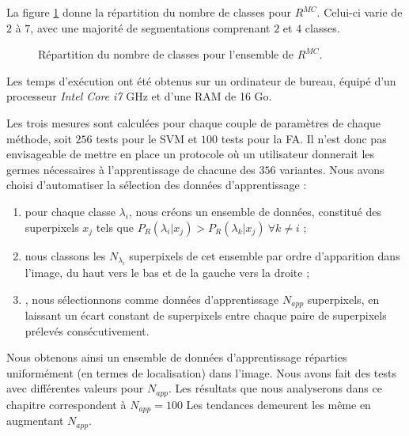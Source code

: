 La figure \ref{fig:saf:stnerClasses} donne la répartition du nombre de classes pour $R^{ MC}$. Celui-ci varie de $2$ à $7$, avec une majorité de segmentations comprenant $2$ et $4$ classes. 
\begin{figure}[htb]
\begin{center}
\scalebox{.5}{

}
\caption{Répartition du nombre de classes pour l'ensemble de  $R^{ MC}$.}
\label{fig:saf:stnerClasses}
\end{center}
\end{figure}

Les temps d'exécution ont été obtenus sur un ordinateur de bureau, équipé d'un processeur \emph{Intel Core i7}  GHz et d'une RAM de 16 Go. 

Les trois mesures sont calculées pour chaque couple de paramètres de chaque méthode, soit $256$ tests pour le SVM et $100$ tests pour la FA. Il n'est donc pas envisageable de mettre en place un protocole où un utilisateur donnerait les germes nécessaires à l'apprentissage de chacune des $356$ variantes. Nous avons choisi d'automatiser la sélection des données d'apprentissage  :
\begin{enumerate}
\item pour chaque classe $\lambda_{i}$, nous créons un ensemble de données, constitué des superpixels $x_{j}$ tels que $P_{R}(\lambda_{i} | x_{j}) > P_{R}(\lambda_{k} | x_{j}) \ \forall k \neq i$ ;
\item nous classons les $N_{\lambda_{i}}$ superpixels de cet ensemble par ordre d'apparition dans l'image, du haut vers le bas et de la gauche vers la droite ;
\item {}, nous sélectionnons comme données d'apprentissage $N_{app}$ superpixels, en laissant un écart constant de  superpixels entre chaque paire de superpixels prélevés consécutivement.
\end{enumerate}
Nous obtenons ainsi un ensemble de données d'apprentissage réparties uniformément (en termes de localisation) dans l'image. Nous avons fait des tests avec différentes valeurs pour $N_{app}$. Les résultats que nous analyserons dans ce chapitre correspondent à $N_{app}=100$ Les tendances demeurent les même en augmentant $N_{app}$.


